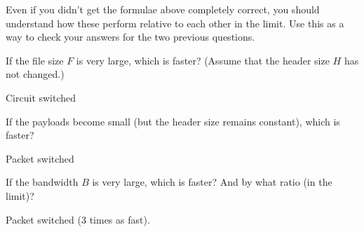 \documentclass[answers]{supervision}
\begin{document}
\begin{questions}
\begin{parts}
\begin{description}
      Even if you didn’t get the formulae above completely correct, you should understand how these perform relative to each other in the limit. Use this as a way to check your answers for the two previous questions.
      \begin{subparts}
        \subpart
        If the file size $F$ is very large, which is faster? (Assume that
the header size $H$ has not changed.)
        \begin{solution}
        Circuit switched
        \end{solution}

        \subpart
        If the payloads become small (but the header size remains constant), which is faster?
        \begin{solution}
        Packet switched
        \end{solution}

        \subpart
        If the bandwidth $B$ is very large, which is faster? And by
what ratio (in the limit)?
        \begin{solution}
        Packet switched (3 times as fast).
        \end{solution}

      \end{subparts}
    \end{description}

  \end{parts}


  
\end{questions}
\end{document}
